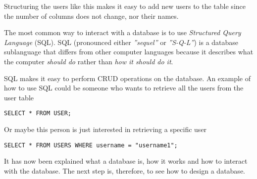 Structuring the users like this makes it easy to add new users to the table since the number of columns does not change, nor their names.

The most common way to interact with a database is to use \textit{Structured Query Language} (SQL).
SQL (pronounced either \textit{''sequel''} or \textit{''S-Q-L''}) is a database sublanguage that differs from other computer languages because it describes what the computer \textit{should do} rather than \textit{how it should do it}.\cite{SQLIntroduction}

SQL makes it easy to perform CRUD operations on the database.\cite{OracleWhatIsDatabase}
An example of how to use SQL could be someone who wants to retrieve all the users from the user table

\begin{lstlisting}[caption={\color{red}indsæt captiontekst}, label=lstSQL-user1]
SELECT * FROM USER;
\end{lstlisting}

Or maybe this person is just interested in retrieving a specific user

\begin{lstlisting}[caption={\color{red}indsæt captiontekst}, label=lstSQL-user2]
SELECT * FROM USERS WHERE username = "username1";
\end{lstlisting}

It has now been explained what a database is, how it works and how to interact with the database.
The next step is, therefore, to see how to design a database.

